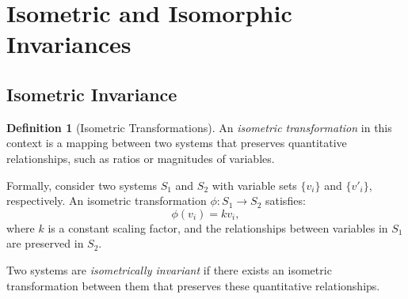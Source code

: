 \documentclass{article}
\theoremstyle{definition}
\newtheorem{definition}{Definition}[section]
\theoremstyle{remark}
\begin{document}
	\section{Isometric and Isomorphic Invariances}
	
	\subsection{Isometric Invariance}
	
	\begin{definition}[Isometric Transformations]
		An \emph{isometric transformation} in this context is a mapping between two systems that preserves quantitative relationships, such as ratios or magnitudes of variables.
		
		Formally, consider two systems $S_1$ and $S_2$ with variable sets $\{v_i\}$ and $\{v'_i\}$, respectively. An isometric transformation $\phi: S_1 \rightarrow S_2$ satisfies:
		\[
		\phi(v_i) = k v_i,
		\]
		where $k$ is a constant scaling factor, and the relationships between variables in $S_1$ are preserved in $S_2$.
		
		Two systems are \emph{isometrically invariant} if there exists an isometric transformation between them that preserves these quantitative relationships.
	\end{definition}
	
\end{document}
